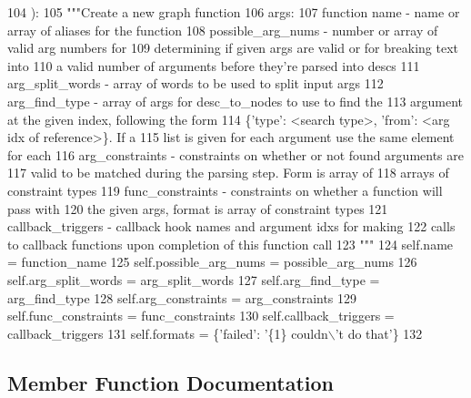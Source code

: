 \begin{DoxyCode}
104     ):
105         \textcolor{stringliteral}{"""Create a new graph function}
106 \textcolor{stringliteral}{        args:}
107 \textcolor{stringliteral}{        function name - name or array of aliases for the function}
108 \textcolor{stringliteral}{        possible\_arg\_nums - number or array of valid arg numbers for}
109 \textcolor{stringliteral}{            determining if given args are valid or for breaking text into}
110 \textcolor{stringliteral}{            a valid number of arguments before they're parsed into descs}
111 \textcolor{stringliteral}{        arg\_split\_words - array of words to be used to split input args}
112 \textcolor{stringliteral}{        arg\_find\_type - array of args for desc\_to\_nodes to use to find the}
113 \textcolor{stringliteral}{            argument at the given index, following the form}
114 \textcolor{stringliteral}{            \{'type': <search type>, 'from': <arg idx of reference>\}. If a}
115 \textcolor{stringliteral}{            list is given for each argument use the same element for each}
116 \textcolor{stringliteral}{        arg\_constraints - constraints on whether or not found arguments are}
117 \textcolor{stringliteral}{            valid to be matched during the parsing step. Form is array of}
118 \textcolor{stringliteral}{            arrays of constraint types}
119 \textcolor{stringliteral}{        func\_constraints - constraints on whether a function will pass with}
120 \textcolor{stringliteral}{            the given args, format is array of constraint types}
121 \textcolor{stringliteral}{        callback\_triggers - callback hook names and argument idxs for making}
122 \textcolor{stringliteral}{            calls to callback functions upon completion of this function call}
123 \textcolor{stringliteral}{        """}
124         self.name = function\_name
125         self.possible\_arg\_nums = possible\_arg\_nums
126         self.arg\_split\_words = arg\_split\_words
127         self.arg\_find\_type = arg\_find\_type
128         self.arg\_constraints = arg\_constraints
129         self.func\_constraints = func\_constraints
130         self.callback\_triggers = callback\_triggers
131         self.formats = \{\textcolor{stringliteral}{'failed'}: \textcolor{stringliteral}{'\{1\} couldn\(\backslash\)'t do that'}\}
132 
\end{DoxyCode}


\subsection{Member Function Documentation}
\mbox{\label{classlight__chats_1_1graph_1_1GraphFunction_af627ff84086a094b84da04e30a97779e}} 
